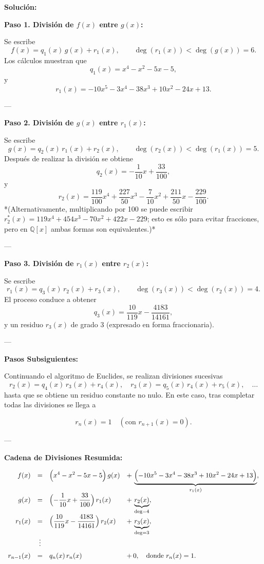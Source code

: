 \textbf{Solución:} 

\textbf{Paso 1. División de \(f(x)\) entre \(g(x)\):}

Se escribe
\[
f(x)= q_1(x)\,g(x) + r_1(x), \qquad \deg(r_1(x)) < \deg(g(x))=6.
\]
Los cálculos muestran que
\[
q_1(x)= x^4 - x^2 - 5x - 5,
\]
y
\[
r_1(x)= -10x^5 - 3x^4 - 38x^3 + 10x^2 - 24x + 13.
\]

---

\textbf{Paso 2. División de \(g(x)\) entre \(r_1(x)\):}

Se escribe
\[
g(x)= q_2(x)\,r_1(x) + r_2(x), \qquad \deg(r_2(x)) < \deg(r_1(x))=5.
\]
Después de realizar la división se obtiene
\[
q_2(x)= -\frac{1}{10}x + \frac{33}{100},
\]
y
\[
r_2(x)= \frac{119}{100}x^4 + \frac{227}{50}x^3 - \frac{7}{10}x^2 + \frac{211}{50}x - \frac{229}{100}.
\]
*(Alternativamente, multiplicando por 100 se puede escribir \(r_2^*(x)=119x^4+454x^3-70x^2+422x-229\); esto es sólo para evitar fracciones, pero en \(\mathbb{Q}[x]\) ambas formas son equivalentes.)*

---

\textbf{Paso 3. División de \(r_1(x)\) entre \(r_2(x)\):}

Se escribe
\[
r_1(x)= q_3(x)\,r_2(x) + r_3(x), \qquad \deg(r_3(x)) < \deg(r_2(x))=4.
\]
El proceso conduce a obtener
\[
q_3(x)= \frac{10}{119}x - \frac{4183}{14161},
\]
y un residuo \(r_3(x)\) de grado 3 (expresado en forma fraccionaria).

---

\textbf{Pasos Subsiguientes:}

Continuando el algoritmo de Euclides, se realizan divisiones sucesivas
\[
r_2(x)= q_4(x)\,r_3(x) + r_4(x),\quad r_3(x)= q_5(x)\,r_4(x) + r_5(x),\quad \dots
\]
hasta que se obtiene un residuo constante no nulo. En este caso, tras completar todas las divisiones se llega a

\[
r_{n}(x)= 1 \quad (\text{con } r_{n+1}(x)=0).
\]

---

\textbf{Cadena de Divisiones Resumida:}

\[
\begin{array}{rcll}
f(x) &=& \displaystyle \Bigl(x^4 - x^2 - 5x - 5\Bigr)\,g(x) 
  &\displaystyle +\, \underbrace{\Bigl(-10x^5 - 3x^4 - 38x^3 + 10x^2 - 24x + 13\Bigr)}_{r_1(x)},\\[2mm]
g(x) &=& \displaystyle \Bigl(-\frac{1}{10}x + \frac{33}{100}\Bigr)\,r_1(x) 
  &\displaystyle +\, \underbrace{r_2(x)}_{\deg=4},\\[2mm]
r_1(x) &=& \displaystyle \Bigl(\frac{10}{119}x - \frac{4183}{14161}\Bigr)\,r_2(x)
  &\displaystyle +\, \underbrace{r_3(x)}_{\deg=3},\\[2mm]
&\vdots& &\\[2mm]
r_{n-1}(x) &=& q_n(x)\,r_n(x) 
  &\displaystyle +\, 0,\quad\text{donde } r_n(x)=1.
\end{array}
\]

